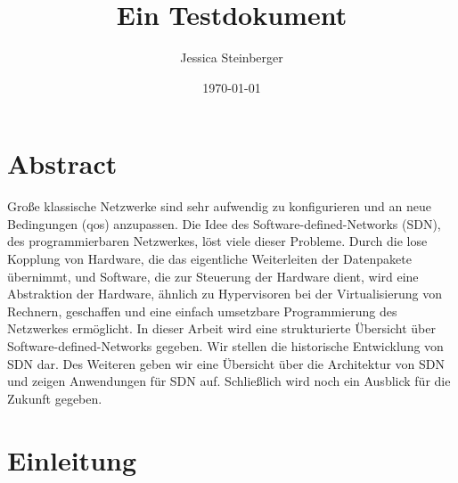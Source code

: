 \documentclass[twoside,12pt]{scrartcl}
\title{Ein Testdokument}
\author{Jessica Steinberger}
\date{\today}
\begin{document}
	
	
	
	\pagestyle{scrheadings}
	\clearscrheadfoot
	\ohead{\leftmark}
	\ifoot{\pagemark} 
	\setheadsepline{1pt} 
	\setfootsepline{1pt}
	
	
	\maketitle
	
	\tableofcontents
	
	\newpage
	
	\printglossary[type=\acronymtype,style=longwithindent]
	\newpage
	
	\printglossary[type=symbolslist,style=long]
	
	\newpage
	
	\section{Abstract}
	
	Große klassische Netzwerke sind sehr aufwendig zu konfigurieren und an neue Bedingungen (qos) anzupassen. Die Idee des Software-defined-Networks (SDN), des programmierbaren Netzwerkes, löst viele dieser Probleme. Durch die lose Kopplung von Hardware, die das eigentliche Weiterleiten der Datenpakete übernimmt, und Software, die zur Steuerung der Hardware dient, wird eine Abstraktion der Hardware, ähnlich zu Hypervisoren bei der Virtualisierung von Rechnern, geschaffen und eine einfach umsetzbare Programmierung des Netzwerkes ermöglicht. In dieser Arbeit wird eine strukturierte Übersicht über Software-defined-Networks gegeben. Wir stellen die historische Entwicklung von SDN dar. Des Weiteren geben wir eine Übersicht über die Architektur von SDN und zeigen Anwendungen für SDN auf. Schließlich wird noch ein Ausblick für die Zukunft gegeben.
	
	\section{Einleitung}
	

	\onehalfspacing
	
\end{document}
